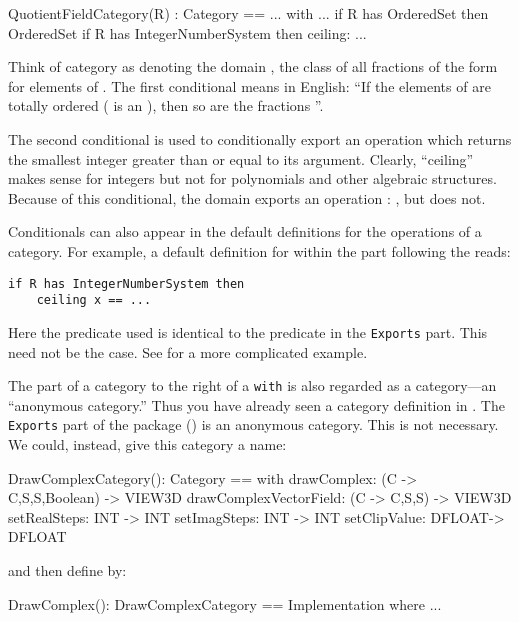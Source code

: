 {{{{{{\begin{xmpLines}
QuotientFieldCategory(R) : Category == ... with ...
     if R has OrderedSet then OrderedSet
     if R has IntegerNumberSystem then
       ceiling: %
         ...
\end{xmpLines}

Think of category  as
denoting the domain , the
class of all fractions of the form  for elements of .
The first conditional means in English:
``If the elements of  are totally ordered (
is an ), then so are the fractions ''.

The second conditional is used to conditionally export an
operation  which returns the smallest integer
greater than or equal to its argument.
Clearly, ``ceiling'' makes sense for integers but not for
polynomials and other algebraic structures.
Because of this conditional,
the domain  exports
an operation
: , but
 does not.

Conditionals can also appear in the default definitions for the
operations of a category.
For example, a default definition for 
within the part following the  reads:

\begin{verbatim}
if R has IntegerNumberSystem then
    ceiling x == ...
\end{verbatim}

Here the predicate used is identical to the predicate
in the {\tt Exports} part.
This need not be the case.
See  for a more complicated example.


The part of a category to the right of a {\tt with} is also
regarded as a category---an ``anonymous category.''
Thus you have already seen a   category definition
  in .
The {\tt Exports} part of the package 
() is an anonymous category.
This is not necessary.
We could, instead, give this category a name:

%
\begin{xmpLines}
DrawComplexCategory(): Category == with
   drawComplex: (C -> C,S,S,Boolean) -> VIEW3D
   drawComplexVectorField: (C -> C,S,S) -> VIEW3D
   setRealSteps: INT -> INT
   setImagSteps: INT -> INT
   setClipValue: DFLOAT-> DFLOAT
\end{xmpLines}
%
and then define  by:
%
\begin{xmpLines}
DrawComplex(): DrawComplexCategory == Implementation
   where
      ...
\end{xmpLines}
%

}}}}}}
